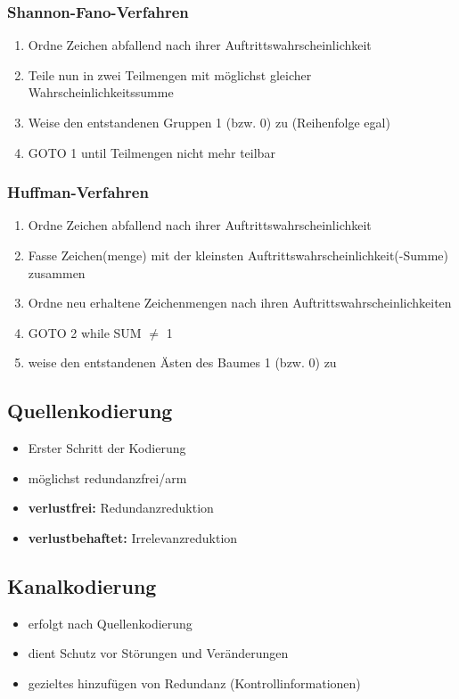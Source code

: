 \documentclass[12pt,a4paper]{article}
\begin{document}
\subsubsection{Shannon-Fano-Verfahren}
\begin{enumerate}
\item Ordne Zeichen abfallend nach ihrer Auftrittswahrscheinlichkeit
\item Teile nun in zwei Teilmengen mit möglichst gleicher Wahrscheinlichkeitssumme
\item Weise den entstandenen Gruppen 1 (bzw. 0) zu (Reihenfolge egal)
\item GOTO 1 until Teilmengen nicht mehr teilbar
\end{enumerate}

\subsubsection{Huffman-Verfahren}
\begin{enumerate}
\item Ordne Zeichen abfallend nach ihrer Auftrittswahrscheinlichkeit
\item Fasse Zeichen(menge) mit der kleinsten Auftrittswahrscheinlichkeit(-Summe) zusammen
\item Ordne neu erhaltene Zeichenmengen nach ihren Auftrittswahrscheinlichkeiten
\item GOTO 2 while SUM $\neq$ 1
\item weise den entstandenen Ästen des Baumes 1 (bzw. 0) zu
\end{enumerate}

\subsection{Quellenkodierung}
\begin{itemize}
\item Erster Schritt der Kodierung
\item möglichst redundanzfrei/arm
\item \textbf{verlustfrei:} Redundanzreduktion
\item \textbf{verlustbehaftet:} Irrelevanzreduktion
\end{itemize}

\subsection{Kanalkodierung}
\begin{itemize}
\item erfolgt nach Quellenkodierung
\item dient Schutz vor Störungen und Veränderungen
\item gezieltes hinzufügen von Redundanz (Kontrollinformationen)
\end{itemize}
\newpage
\end{document}
